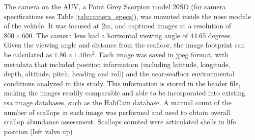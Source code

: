 \documentclass {udthesis}
\begin{document}
The camera on the AUV, a Point Grey Scorpion model 20SO (for camera specifications see Table \ref{tab:camera_specs}), 
was mounted inside the nose module of the vehicle.
It was focused at 2\;m, and captured
images at a resolution of $800\times600$.  The camera lens had a horizontal viewing 
angle of 44.65 degrees.  Given the viewing angle and distance from the seafloor, 
the image footprint can be calculated as $1.86\times1.40$\;m$^2$.
Each image was saved in jpeg format, with metadata that included position information 
(including latitude, longitude, depth, altitude, pitch, heading and roll)  
and the near-seafloor environmental conditions analyzed in this study.  
This information is stored in the header file, making the images readily comparable and 
able to be incorporated into existing \gls{rsa} image databases, such as the 
HabCam database.
A manual count of the number of scallops in each image was performed and used to obtain overall scallop
abundance assessment.
Scallops counted were articulated shells in life position (left valve up) \cite{walker}.
%
\end{document}

